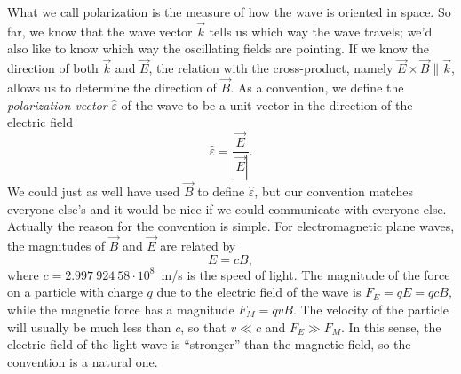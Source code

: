 What we call polarization is the measure of how the wave is oriented in 
space. So far, we know that the wave vector $\vec{k}$ tells us which way the 
wave travels;  we'd also like to know which way the oscillating fields are 
pointing. If we know the direction of both $\vec{k}$ and $\vec{E}$, the 
relation with the cross-product, namely $\vec{E}\times\vec{B}\parallel\vec{k}$,
allows us to determine the direction of $\vec{B}$.  As a convention, we define 
the {\it polarization vector} $\hat{\varepsilon}$ of the wave to be a unit 
vector in the direction of the electric field
$$ \hat{\varepsilon} =\frac{\vec{E}}{|\vec{E}|}. $$   
We could just as well have used $\vec{B}$ to define $\hat{\varepsilon}$, but 
our convention matches everyone else's and it would be nice if we could 
communicate with everyone else. Actually the reason for the convention is 
simple. For electromagnetic plane waves, the magnitudes of $\vec{B}$ and 
$\vec{E}$ are related by
$$ E=cB, $$   
where $c=2.997~924~58 \cdot 10^8$~m/s is the speed of light.  The magnitude of 
the force on a particle with charge $q$ due to the electric field of the wave 
is $F_E = qE = qcB$, while the magnetic force has a magnitude $F_M=qvB$.  
The velocity of the particle will usually be much less than $c$, so that 
$v\ll c$ and $F_E \gg F_M$. In this sense, the electric field of the light 
wave is ``stronger'' than the magnetic field, so the convention is a natural 
one.

